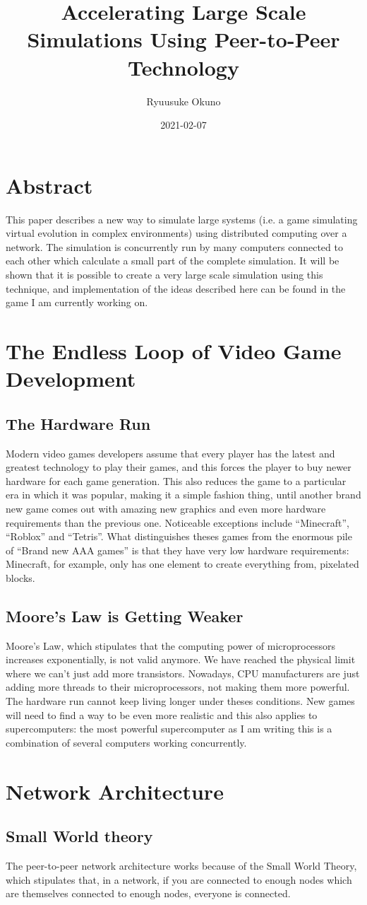 \documentclass{article}
\title{Accelerating Large Scale Simulations Using Peer-to-Peer Technology}
\date{2021-02-07}
\author{Ryuusuke Okuno}
\begin{document}
\maketitle
{}
\newpage
{}

\section{Abstract}
This paper describes a new way to simulate large systems (i.e. a game
simulating virtual evolution in complex environments) using
distributed computing over a network. The simulation is concurrently
run by many computers connected to each other which calculate a small
part of the complete simulation. It will be shown that it is possible
to create a very large scale simulation using this technique, and
implementation of the ideas described here can be found in the game I
am currently working on.

\section{The Endless Loop of Video Game Development}
\subsection{The Hardware Run}
Modern video games developers assume that every player has the latest
and greatest technology to play their games, and this forces the
player to buy newer hardware for each game generation. This also
reduces the game to a particular era in which it was popular, making
it a simple fashion thing, until another brand new game comes out with
amazing new graphics and even more hardware requirements than the
previous one. Noticeable exceptions include ``Minecraft'', ``Roblox''
and ``Tetris''. What distinguishes theses games from the enormous pile
of ``Brand new AAA games'' is that they have very low hardware
requirements: Minecraft, for example, only has one element to create
everything from, pixelated blocks.

\subsection{Moore's Law is Getting Weaker}
Moore's Law, which stipulates that the computing power of
microprocessors increases exponentially, is not valid anymore. We have
reached the physical limit where we can't just add more
transistors. Nowadays, CPU manufacturers are just adding more threads
to their microprocessors, not making them more powerful. The hardware
run cannot keep living longer under theses conditions. New games will
need to find a way to be even more realistic and this also applies to
supercomputers: the most powerful supercomputer as I am writing this
is a combination of several computers working concurrently.

\section{Network Architecture}
\subsection{Small World theory}
The peer-to-peer network architecture works because of the Small World
Theory, which stipulates that, in a network, if you are connected to
enough nodes which are themselves connected to enough nodes, everyone
is connected.
\end{document}
